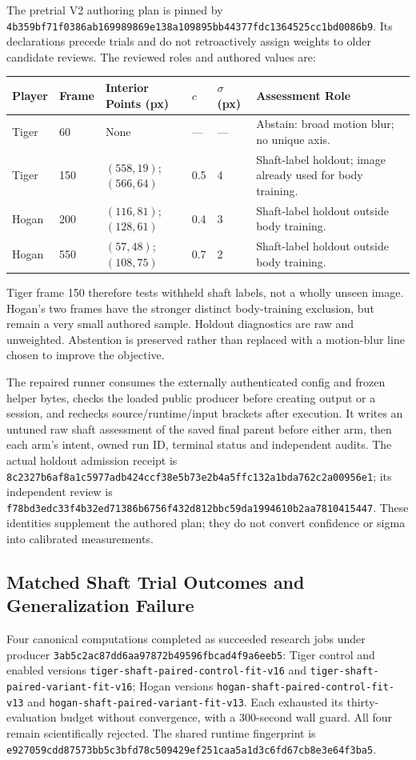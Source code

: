 \documentclass[11pt,letterpaper]{article}
\newcommand{\code}[1]{\nolinkurl{#1}}
\newcommand{\hash}[1]{{\footnotesize\nolinkurl{#1}}}
\begin{document}
The pretrial V2 authoring plan is pinned by
\hash{4b359bf71f0386ab169989869e138a109895bb44377fdc1364525cc1bd0086b9}.
Its declarations precede trials and do not retroactively assign weights to
older candidate reviews. The reviewed roles and authored values are:
\begin{longtable}{@{}p{0.78in}p{0.55in}p{1.35in}p{0.58in}p{0.58in}p{2.18in}@{}}
\toprule Player & Frame & Interior Points (px) & $c$ & $\sigma$ (px) & Assessment Role\\
\midrule\endhead
Tiger & 60 & None & --- & --- & Abstain: broad motion blur; no unique axis.\\
Tiger & 150 & $(558,19)$; $(566,64)$ & 0.5 & 4 & Shaft-label holdout; image already used for body training.\\
Hogan & 200 & $(116,81)$; $(128,61)$ & 0.4 & 3 & Shaft-label holdout outside body training.\\
Hogan & 550 & $(57,48)$; $(108,75)$ & 0.7 & 2 & Shaft-label holdout outside body training.\\
\bottomrule
\end{longtable}
Tiger frame 150 therefore tests withheld shaft labels, not a wholly unseen
image. Hogan's two frames have the stronger distinct body-training exclusion,
but remain a very small authored sample. Holdout diagnostics are raw and
unweighted. Abstention is preserved rather than replaced with a motion-blur
line chosen to improve the objective.

The repaired runner consumes the externally authenticated config and frozen
helper bytes, checks the loaded public producer before creating output or a
session, and rechecks source/runtime/input brackets after execution. It writes
an untuned raw shaft assessment of the saved final parent before either arm,
then each arm's intent, owned run ID, terminal status and independent audits.
The actual holdout admission receipt is
\hash{8c2327b6af8a1c5977adb424ccf38e5b73e2b4a5ffc132a1bda762c2a00956e1};
its independent review is
\hash{f78bd3edc33f4b32ed71386b6756f432d812bbc59da1994610b2aa7810415447}.
These identities supplement the authored plan; they do not convert confidence
or sigma into calibrated measurements.

\subsection{Matched Shaft Trial Outcomes and Generalization Failure}
Four canonical computations completed as succeeded research jobs under producer
\code{3ab5c2ac87dd6aa97872b49596fbcad4f9a6eeb5}: Tiger control and enabled
versions \code{tiger-shaft-paired-control-fit-v16} and
\code{tiger-shaft-paired-variant-fit-v16}; Hogan versions
\code{hogan-shaft-paired-control-fit-v13} and
\code{hogan-shaft-paired-variant-fit-v13}. Each exhausted its thirty-evaluation
budget without convergence, with a 300-second wall guard. All four remain
scientifically rejected. The shared runtime fingerprint is
\hash{e927059cdd87573bb5c3bfd78c509429ef251caa5a1d3c6fd67cb8e3e64f3ba5}.
\end{document}

